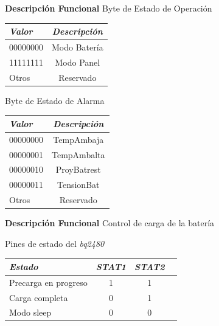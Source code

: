 \documentclass[aspectratio=43, handout]{beamer}
\begin{document}
\begin{frame}{\textbf{\LARGE{Descripción Funcional}}}
	\fontsize{15pt}{15}\selectfont
		\centering
	\noindent Byte de Estado de Operación
\begin{table}[ht]
	\centering
	\fontsize{13pt}{13}\selectfont
	\begin{tabular}{@{} l *1c @{}}    %
	\hline
		\emph{\textbf{Valor}} & \emph{\textbf{Descripción}}\\
		\hline
		00000000 &  Modo Batería\\
		11111111 &  Modo Panel\\
		Otros & Reservado\\
		\hline
	\end{tabular}
	\label{tab:edoope}
\end{table}

\noindent Byte de Estado de Alarma
\begin{table}[ht]
	\centering
	\fontsize{13pt}{13}\selectfont
	\begin{tabular}{@{} l *1c @{}}    %
	\hline
		\emph{\textbf{Valor}} & \emph{\textbf{Descripción}}\\
		\hline
		00000000 & TempAmbaja\\	
		00000001 & TempAmbalta\\
		00000010 & ProyBatrest\\
		00000011 & TensionBat\\
		Otros & Reservado\\
		\hline
	\end{tabular}
\end{table}
\end{frame}

\begin{frame}{\textbf{\LARGE{Descripción Funcional}}}
\fontsize{15pt}{15}\selectfont
	\centering
\noindent Control de carga de la batería\\
\vspace{20px}
\begin{table}[ht]
	\centering
		\noindent Pines de estado del \textit{bq2480}
	\vspace{5px}
	\begin{tabular}{@{} l *3c @{}}    %
		\hline		
		\emph{\textbf{Estado}} & \emph{\textbf{STAT1}} & \emph{\textbf{STAT2}}\\
		\hline
		Precarga en progreso &  1 & 1 \\	
		Carga completa &  0 & 1 \\
		Modo sleep &  0 & 0 \\
		\hline
	\end{tabular}
	\label{tab:STAT}
\end{table}
\end{frame}
\end{document}
